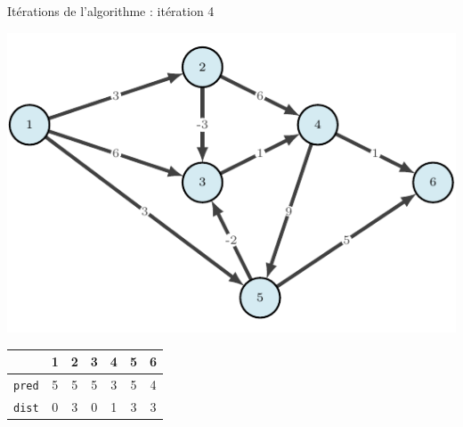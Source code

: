 \begin{frame}{Itérations de l'algorithme : itération 4}
    \begin{center}
        \includegraphics[height=.6\textheight]{fig/bellmann-0.pdf}      
    \begin{tabular}{c|cccccc}
      
        & 1    &2      &3      &4      &5      &6      \\
        \hline
        \texttt{pred} &5        &5      &5      &3      &5      &4      \\
        \texttt{dist} & 0       &3      &0      &1      &3      &3      \\
                    \end{tabular}
\end{center}
\end{frame}


